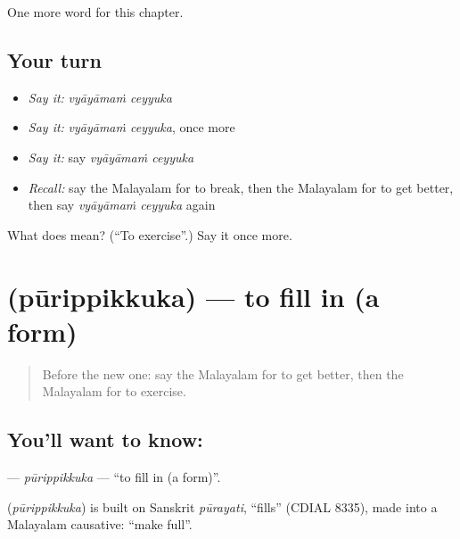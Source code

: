 \begin{grammarlens}[title={What you've built}]
One more word for this chapter.
\end{grammarlens}

\subsection*{Your turn}
\begin{itemize}
\raggedright
  \item \emph{Say it:} \emph{vyāyāmaṁ ceyyuka}
  \item \emph{Say it:} \emph{vyāyāmaṁ ceyyuka}, once more
  \item \emph{Say it:} say \emph{vyāyāmaṁ ceyyuka}
  \item \emph{Recall:} say the Malayalam for to break, then the Malayalam for to get better, then say \emph{vyāyāmaṁ ceyyuka} again
\end{itemize}

\begin{tcolorbox}[breakable,colback=teal!4,colframe=teal!35!black,title={Before you move on}]
What does   mean? (\textquotedblleft{}To exercise\textquotedblright{}.) Say it once more.
\end{tcolorbox}
\section[\texorpdfstring{\ml{പൂരിപ്പിക്കുക} (pūrippikkuka)}{പൂരിപ്പിക്കുക (pūrippikkuka)}]{ (pūrippikkuka) — to fill in (a form)}

\label{lesson:ML-C184-purippikkuka}



\begin{quote}
Before the new one: say the Malayalam for to get better, then the Malayalam for to exercise.
\end{quote}

\subsection*{You'll want to know: }
\textbf{} — \emph{pūrippikkuka} — \textquotedblleft{}to fill in (a form)\textquotedblright{}.

\begin{cousinweb}
\textbf{} (\emph{pūrippikkuka}) is built on Sanskrit \emph{pūrayati}, \textquotedblleft{}fills\textquotedblright{} (CDIAL 8335), made into a Malayalam causative: \textquotedblleft{}make full\textquotedblright{}.
\end{cousinweb}

